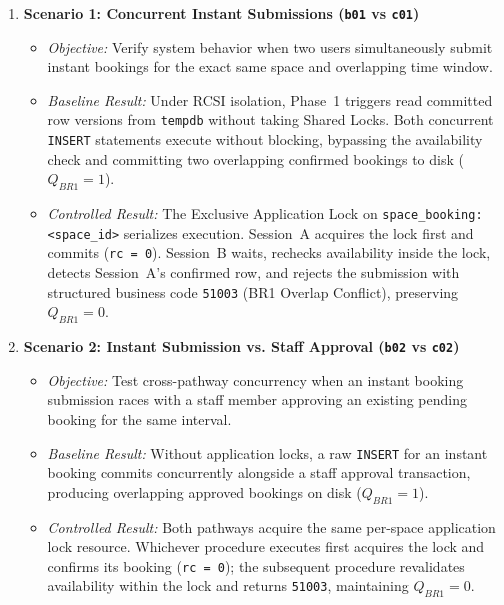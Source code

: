 \begin{enumerate}[leftmargin=*]
    \item \textbf{Scenario 1: Concurrent Instant Submissions (\texttt{b01} vs \texttt{c01})}
    \begin{itemize}
        \item \emph{Objective:} Verify system behavior when two users simultaneously submit instant bookings for the exact same space and overlapping time window.
        \item \emph{Baseline Result:} Under RCSI isolation, Phase~1 triggers read committed row versions from \texttt{tempdb} without taking Shared Locks. Both concurrent \texttt{INSERT} statements execute without blocking, bypassing the availability check and committing two overlapping confirmed bookings to disk ($Q_{BR1} = 1$).
        \item \emph{Controlled Result:} The Exclusive Application Lock on \texttt{space\_booking:<space\_id>} serializes execution. Session~A acquires the lock first and commits (\texttt{rc = 0}). Session~B waits, rechecks availability inside the lock, detects Session~A's confirmed row, and rejects the submission with structured business code \texttt{51003} (BR1 Overlap Conflict), preserving $Q_{BR1} = 0$.
    \end{itemize}

    \item \textbf{Scenario 2: Instant Submission vs. Staff Approval (\texttt{b02} vs \texttt{c02})}
    \begin{itemize}
        \item \emph{Objective:} Test cross-pathway concurrency when an instant booking submission races with a staff member approving an existing pending booking for the same interval.
        \item \emph{Baseline Result:} Without application locks, a raw \texttt{INSERT} for an instant booking commits concurrently alongside a staff approval transaction, producing overlapping approved bookings on disk ($Q_{BR1} = 1$).
        \item \emph{Controlled Result:} Both pathways acquire the same per-space application lock resource. Whichever procedure executes first acquires the lock and confirms its booking (\texttt{rc = 0}); the subsequent procedure revalidates availability within the lock and returns \texttt{51003}, maintaining $Q_{BR1} = 0$.
    \end{itemize}


\end{enumerate}
